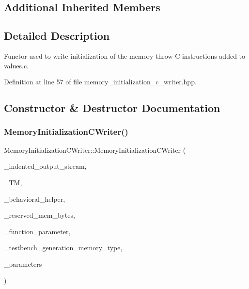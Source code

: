 \subsection*{Additional Inherited Members}


\subsection{Detailed Description}
Functor used to write initialization of the memory throw C instructions added to values.\+c. 

Definition at line 57 of file memory\+\_\+initialization\+\_\+c\+\_\+writer.\+hpp.



\subsection{Constructor \& Destructor Documentation}
\mbox{\label{classMemoryInitializationCWriter_a2617a7678c80a2b33a0ecc97f3f509fd}} 
\subsubsection{\texorpdfstring{Memory\+Initialization\+C\+Writer()}{MemoryInitializationCWriter()}}
{\footnotesize\ttfamily Memory\+Initialization\+C\+Writer\+::\+Memory\+Initialization\+C\+Writer (\begin{DoxyParamCaption}\item[{const \hyperlink{indented__output__stream_8hpp_ab32278e11151ef292759c88e99b77feb}{Indented\+Output\+Stream\+Ref}}]{\+\_\+indented\+\_\+output\+\_\+stream,  }\item[{const \hyperlink{tree__manager_8hpp_a792e3f1f892d7d997a8d8a4a12e39346}{tree\+\_\+manager\+Const\+Ref}}]{\+\_\+\+TM,  }\item[{const \hyperlink{behavioral__helper_8hpp_aae973b54cac87eef3b27442aa3e1e425}{Behavioral\+Helper\+Const\+Ref}}]{\+\_\+behavioral\+\_\+helper,  }\item[{const unsigned long int}]{\+\_\+reserved\+\_\+mem\+\_\+bytes,  }\item[{const \hyperlink{tree__node_8hpp_a3cf5d02292c940f3892425a5b5fdec3c}{tree\+\_\+node\+Const\+Ref}}]{\+\_\+function\+\_\+parameter,  }\item[{const \hyperlink{testbench__generation_8hpp_ad84688161fffbe7da2fc2b9a39b93198}{Testbench\+Generation\+\_\+\+Memory\+Type}}]{\+\_\+testbench\+\_\+generation\+\_\+memory\+\_\+type,  }\item[{const \hyperlink{Parameter_8hpp_a37841774a6fcb479b597fdf8955eb4ea}{Parameter\+Const\+Ref}}]{\+\_\+parameters }\end{DoxyParamCaption})}



